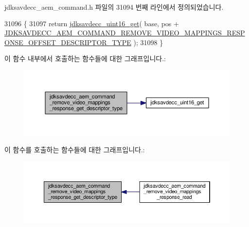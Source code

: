 jdksavdecc\+\_\+aem\+\_\+command.\+h 파일의 31094 번째 라인에서 정의되었습니다.


\begin{DoxyCode}
31096 \{
31097     \textcolor{keywordflow}{return} \hyperlink{group__endian_ga3fbbbc20be954aa61e039872965b0dc9}{jdksavdecc\_uint16\_get}( base, pos + 
      \hyperlink{group__command__remove__video__mappings__response_gaba6e54367591f5ec123c801f27317370}{JDKSAVDECC\_AEM\_COMMAND\_REMOVE\_VIDEO\_MAPPINGS\_RESPONSE\_OFFSET\_DESCRIPTOR\_TYPE}
       );
31098 \}
\end{DoxyCode}


이 함수 내부에서 호출하는 함수들에 대한 그래프입니다.\+:
\nopagebreak
\begin{figure}[H]
\begin{center}
\leavevmode
\includegraphics[width=350pt]{group__command__remove__video__mappings__response_ga5fea68f5bfa4aa77172a6b98a462f557_cgraph}
\end{center}
\end{figure}




이 함수를 호출하는 함수들에 대한 그래프입니다.\+:
\nopagebreak
\begin{figure}[H]
\begin{center}
\leavevmode
\includegraphics[width=350pt]{group__command__remove__video__mappings__response_ga5fea68f5bfa4aa77172a6b98a462f557_icgraph}
\end{center}
\end{figure}


